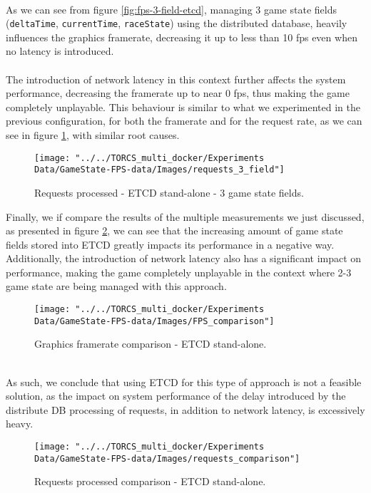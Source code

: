 \\ As we can see from figure \ref{fig:fps-3-field-etcd}, managing 3 game state fields (\texttt{deltaTime}, \texttt{currentTime}, \texttt{raceState}) using the distributed database, heavily influences the graphics framerate, decreasing it up to less than 10 fps even when no latency is introduced. \\ \\
The introduction of network latency in this context further affects the system performance, decreasing the framerate up to near 0 fps, thus making the game completely unplayable. This behaviour is similar to what we experimented in the previous configuration, for both the framerate and for the request rate, as we can see in figure \ref{fig:requests-3-field-etcd}, with similar root causes.
\begin{figure}[h!]
	\centering
	\texttt{[image: "../../TORCS\_multi\_docker/Experiments Data/GameState-FPS-data/Images/requests\_3\_field"]}
	\caption[Requests processed - ETCD stand-alone - 3 game state fields]{Requests processed - ETCD stand-alone - 3 game state fields.}
	\label{fig:requests-3-field-etcd}
\end{figure}
Finally, we if compare the results of the multiple measurements we just discussed, as presented in figure \ref{fig:fps-comparison-etcd}, we can see that the increasing amount of game state fields stored into ETCD greatly impacts its performance in a negative way. Additionally, the introduction of network latency also has a significant impact on performance, making the game completely unplayable in the context where 2-3 game state are being managed with this approach. \\ 
\begin{figure}[h!]
	\centering
	\texttt{[image: "../../TORCS\_multi\_docker/Experiments Data/GameState-FPS-data/Images/FPS\_comparison"]}
	\caption[Graphics framerate comparison - ETCD stand-alone]{Graphics framerate comparison - ETCD stand-alone.}
	\label{fig:fps-comparison-etcd}
\end{figure}
\\ As such, we conclude that using ETCD for this type of approach is not a feasible solution, as the impact on system performance of the delay introduced by the distribute DB processing of requests, in addition to network latency, is excessively heavy.
\begin{figure}[h!]
	\centering
	\texttt{[image: "../../TORCS\_multi\_docker/Experiments Data/GameState-FPS-data/Images/requests\_comparison"]}
	\caption[Requests processed comparison - ETCD stand-alone]{Requests processed comparison - ETCD stand-alone.}
	\label{fig:requests-comparison-etcd}
\end{figure}

